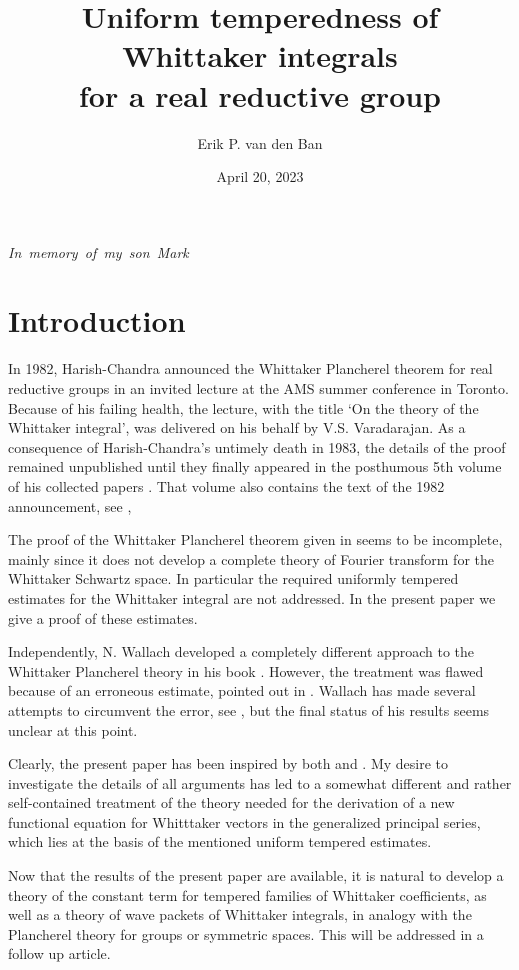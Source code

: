 \documentclass[12pt,a4paper]{article}
\title{Uniform temperedness of Whittaker integrals\\for a real reductive group}
\author{Erik P. van den Ban}
\date{April 20, 2023}
\numberwithin{Thm}{section}
\numberwithin{equation}{section}
\numberwithin{equation}{section}
\begin{document}
\maketitle
\hfill\mbox{\em In memory of my son Mark}
\tableofcontents
\section*{Introduction}
In 1982, Harish-Chandra announced the Whittaker Plancherel theorem for 
real reductive groups in an invited lecture at the AMS summer conference in Toronto. Because of 
his failing health, the lecture, with the title `On the theory of the Whittaker integral',  was delivered 
 on his behalf by V.S. Varadarajan.
As a consequence of Harish-Chandra's untimely death in 1983, the details of the proof remained 
unpublished until they finally appeared in the posthumous 5th volume of his collected papers \cite[pp.~141-307]{HCwhit}. That volume also contains the text of the 1982 announcement,
see \cite[\S 1.2]{HCwhit},

The proof of the Whittaker Plancherel theorem given in \cite{HCwhit} seems to be incomplete, mainly since it does not develop a complete theory of Fourier transform for the Whittaker Schwartz space. 
In particular the required uniformly tempered estimates for the Whittaker integral are not addressed.
In the present paper we give a proof of these estimates. 

Independently, N. Wallach developed a completely different approach to the Whittaker Plancherel theory 
in his book \cite{Wrrg2}. However, the treatment was flawed because of an erroneous 
estimate, pointed out in \cite[Remark 7.5]{BKcf}.  Wallach has made several attempts
to circumvent the error, see \cite{Wwhitrepair}, but the final status of his results 
seems unclear
at this point.

Clearly, the present paper has been inspired by both \cite{HCwhit} and \cite{Wrrg2}.
My desire to investigate the details of all arguments has led to 
a somewhat different and rather self-contained treatment of the theory needed for  
the derivation of a new functional equation for Whitttaker vectors in the generalized
principal series, which lies at the basis of the mentioned uniform tempered estimates.

Now that the results of the present paper are available, it is natural to develop a theory of the constant term for tempered families of Whittaker coefficients, as well as a theory of wave packets of Whittaker integrals, in analogy with the Plancherel theory for groups or symmetric spaces. This will be addressed in a follow up article.
\end{document}
